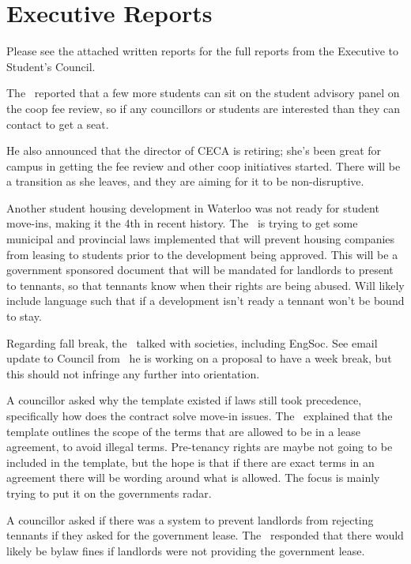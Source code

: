\section*{Executive Reports}

Please see the attached written reports for the full reports from the Executive
to Student's Council. 

\begin{information}

    The \vpe\ reported that a few more students can sit on the student advisory
    panel on the coop fee review, so if any councillors or students 
    are interested than they can contact \andrewc to get a seat.

    He also announced that the director of CECA is retiring; she's been great 
    for campus in getting the fee review and other coop initiatives started. 
    There will be a transition as she leaves, and they are aiming for it to be
    non-disruptive.

    Another student housing development in Waterloo was not ready for student
    move-ins, making it the 4th in recent history. The \vpe\ is trying to get
    some municipal and provincial laws implemented that will prevent housing
    companies from leasing to students prior to the development being approved.
    This will be a government sponsored document that will be mandated for
    landlords to present to tennants, so that tennants know when their rights
    are being abused. Will likely include language such that if a development
    isn't ready a tennant won't be bound to stay.

    Regarding fall break, the \vped\ talked with societies, including EngSoc.
    See email update to Council from \andrewc\, he is working on a proposal to
    have a week break, but this should not infringe any further into
    orientation. 

    A councillor asked why the template existed if laws still took precedence,  
    specifically how does the contract solve move-in issues. 
    The \vpe\ explained that the template outlines the scope of the terms
    that are allowed to be in a lease agreement, to avoid illegal terms.
    Pre-tenancy rights are maybe not going to be included in the template, but 
    the hope is that if there are exact terms in an agreement there will be
    wording around what is allowed. The focus is mainly trying to put it on the
    governments radar. 

    A councillor asked if there was a system to prevent landlords from
    rejecting tennants if they asked for the government lease. The \vpe\
    responded that there would likely be bylaw fines if landlords were not
    providing the government lease. 


\end{information}
